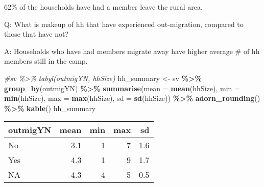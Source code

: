 \documentclass[
]{article}
\newenvironment{Shaded}{\begin{snugshade}}{\end{snugshade}}
\newcommand{\AttributeTok}[1]{\textcolor[rgb]{0.13,0.29,0.53}{#1}}
\newcommand{\CommentTok}[1]{\textcolor[rgb]{0.56,0.35,0.01}{\textit{#1}}}
\newcommand{\FunctionTok}[1]{\textcolor[rgb]{0.13,0.29,0.53}{\textbf{#1}}}
\newcommand{\NormalTok}[1]{#1}
\newcommand{\OtherTok}[1]{\textcolor[rgb]{0.56,0.35,0.01}{#1}}
\newcommand{\SpecialCharTok}[1]{\textcolor[rgb]{0.81,0.36,0.00}{\textbf{#1}}}
\begin{document}
62\% of the households have had a member leave the rural area.

Q: What is makeup of hh that have experienced out-migration, compared to
those that have not?

A: Households who have had members migrate away have higher average \#
of hh members still in the camp.

\begin{Shaded}
\begin{Highlighting}[]
\CommentTok{\#sv \%\textgreater{}\% tabyl(outmigYN, hhSize) }
\NormalTok{hh\_summary }\OtherTok{\textless{}{-}}\NormalTok{ sv }\SpecialCharTok{\%\textgreater{}\%} \FunctionTok{group\_by}\NormalTok{(outmigYN) }\SpecialCharTok{\%\textgreater{}\%} 
  \FunctionTok{summarise}\NormalTok{(}\AttributeTok{mean =} \FunctionTok{mean}\NormalTok{(hhSize),}
            \AttributeTok{min =} \FunctionTok{min}\NormalTok{(hhSize),}
            \AttributeTok{max =} \FunctionTok{max}\NormalTok{(hhSize),}
            \AttributeTok{sd  =} \FunctionTok{sd}\NormalTok{(hhSize)) }\SpecialCharTok{\%\textgreater{}\%} 
  \FunctionTok{adorn\_rounding}\NormalTok{() }\SpecialCharTok{\%\textgreater{}\%}
  \FunctionTok{kable}\NormalTok{()}
\NormalTok{hh\_summary}
\end{Highlighting}
\end{Shaded}

\begin{longtable}[]{@{}lrrrr@{}}
\toprule\noalign{}
outmigYN & mean & min & max & sd \\
\midrule\noalign{}
\endhead
\bottomrule\noalign{}
\endlastfoot
No & 3.1 & 1 & 7 & 1.6 \\
Yes & 4.3 & 1 & 9 & 1.7 \\
NA & 4.3 & 4 & 5 & 0.5 \\
\end{longtable}

\begin{Shaded}
\end{Shaded}
\end{document}
